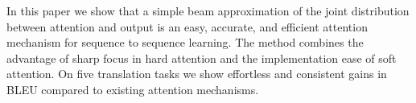 In this paper we show that a simple beam approximation of the joint distribution between attention and output is an easy, accurate, and efficient attention mechanism for sequence to sequence learning. The method combines the advantage of sharp focus in hard attention and the implementation ease of soft attention. On five translation tasks we show effortless and consistent gains in BLEU  compared to existing attention mechanisms.
